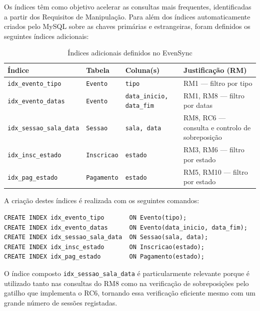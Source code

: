 \documentclass[runningheads]{llncs}
\begin{document}
                Os índices têm como objetivo acelerar as consultas mais frequentes, identificadas a partir dos Requisitos de Manipulação. Para além dos índices automaticamente criados pelo MySQL sobre as chaves primárias e estrangeiras, foram definidos os seguintes índices adicionais:

                \begin{table}[H]
                \centering
                \begin{tabular}{|l|l|l|l|}
                \hline
                \textbf{Índice} & \textbf{Tabela} & \textbf{Coluna(s)} & \textbf{Justificação (RM)} \\ \hline
                \texttt{idx\_evento\_tipo}      & \texttt{Evento}    & \texttt{tipo}                    & RM1 — filtro por tipo \\ \hline
                \texttt{idx\_evento\_datas}     & \texttt{Evento}    & \texttt{data\_inicio, data\_fim}  & RM1, RM8 — filtro por datas \\ \hline
                \texttt{idx\_sessao\_sala\_data}& \texttt{Sessao}    & \texttt{sala, data}              & RM8, RC6 — consulta e controlo de sobreposição \\ \hline
                \texttt{idx\_insc\_estado}      & \texttt{Inscricao} & \texttt{estado}                  & RM3, RM6 — filtro por estado \\ \hline
                \texttt{idx\_pag\_estado}       & \texttt{Pagamento} & \texttt{estado}                  & RM5, RM10 — filtro por estado \\ \hline
                \end{tabular}
                \vspace{0.2cm}
                \caption{Índices adicionais definidos no EvenSync} \label{tab:indices}
                \end{table}

                A criação destes índices é realizada com os seguintes comandos:

                \begin{verbatim}
CREATE INDEX idx_evento_tipo       ON Evento(tipo);
CREATE INDEX idx_evento_datas      ON Evento(data_inicio, data_fim);
CREATE INDEX idx_sessao_sala_data  ON Sessao(sala, data);
CREATE INDEX idx_insc_estado       ON Inscricao(estado);
CREATE INDEX idx_pag_estado        ON Pagamento(estado);
                \end{verbatim}

                O índice composto \texttt{idx\_sessao\_sala\_data} é particularmente relevante porque é utilizado tanto nas consultas do RM8 como na verificação de sobreposições pelo gatilho que implementa o RC6, tornando essa verificação eficiente mesmo com um grande número de sessões registadas.
\end{document}
